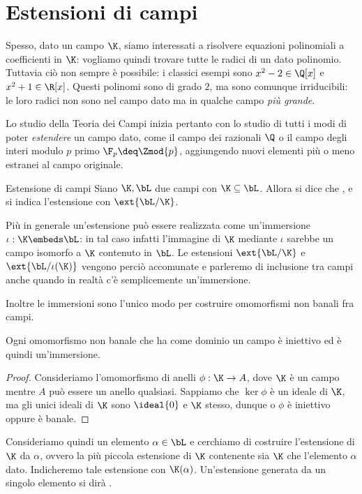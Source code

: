 \section{Estensioni di campi}

Spesso, dato un campo $\K$, siamo interessati a risolvere equazioni polinomiali a coefficienti in $\K$: vogliamo quindi trovare tutte le radici di un dato polinomio. Tuttavia ciò non sempre è possibile: i classici esempi sono $x^2 - 2 \in \Q[x]$ e $x^2 + 1 \in \R[x]$. Questi polinomi sono di grado $2$, ma sono comunque irriducibili: le loro radici non sono nel campo dato ma in qualche campo \emph{più grande}.   

Lo studio della Teoria dei Campi inizia pertanto con lo studio di tutti i modi di poter \emph{estendere} un campo dato, come il campo dei razionali $\Q$ o il campo degli interi modulo $p$ primo $\F_p \deq \Zmod{p}$, aggiungendo nuovi elementi più o meno estranei al campo originale.

\begin{definition}
    {Estensione di campi}{}
    Siano $\K, \bL$ due campi con $\K \subseteq \bL$. Allora si dice che , e si indica l'estensione con $\ext{\bL / \K}$.  
\end{definition}

Più in generale un'estensione può essere realizzata come un'immersione $\iota : \K \embeds \bL$: in tal caso infatti l'immagine di $\K$ mediante $\iota$ sarebbe un campo isomorfo a $\K$ contenuto in $\bL$. Le estensioni $\ext{\bL / \K}$ e $\ext{\bL / \iota(\K)}$ vengono perciò accomunate e parleremo di inclusione tra campi anche quando in realtà c'è semplicemente un'immersione.

Inoltre le immersioni sono l'unico modo per costruire omomorfismi non banali fra campi.
\begin{lemma}
    {}{}
    Ogni omomorfismo non banale che ha come dominio un campo è iniettivo ed è quindi un'immersione.
\end{lemma}
\begin{proof}
    Consideriamo l'omomorfismo di anelli $\phi : \K \to A$, dove $\K$ è un campo mentre $A$ può essere un anello qualsiasi. Sappiamo che $\ker \phi$ è un ideale di $\K$, ma gli unici ideali di $\K$ sono $\ideal{0}$ e $\K$ stesso, dunque o $\phi$ è iniettivo oppure è banale.  
\end{proof}

Consideriamo quindi un elemento $\alpha \in \bL$ e cerchiamo di costruire l'estensione di $\K$  da $\alpha$, ovvero la più piccola estensione di $\K$ contenente sia $\K$ che l'elemento $\alpha$ dato. Indicheremo tale estensione con $\K(\alpha)$. Un'estensione generata da un singolo elemento si dirà .

